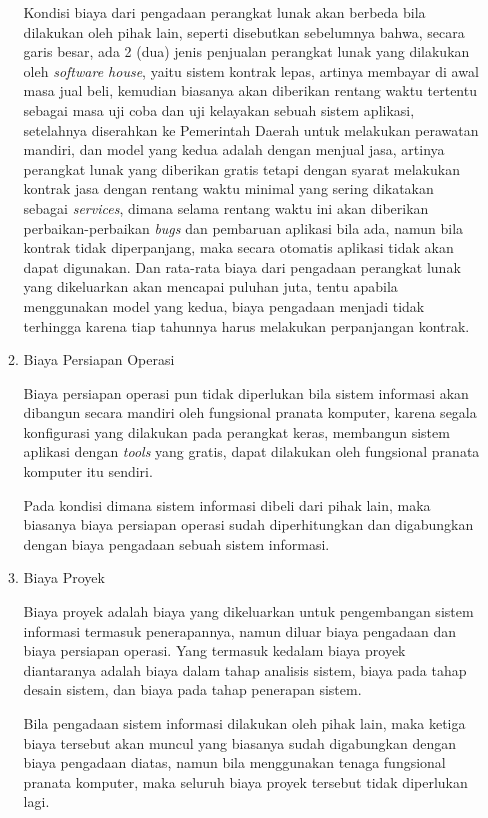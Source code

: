 \documentclass[pdftex,12pt, oneside]{article}
\begin{document}
\begin{enumerate}
\begin{enumerate}
Kondisi biaya dari pengadaan perangkat lunak akan berbeda bila dilakukan oleh pihak lain, seperti disebutkan sebelumnya bahwa, secara garis besar, ada 2 (dua) jenis penjualan perangkat lunak yang dilakukan oleh \textit{software house}, yaitu sistem kontrak lepas, artinya membayar di awal masa jual beli, kemudian biasanya akan diberikan rentang waktu tertentu sebagai masa uji coba dan uji kelayakan sebuah sistem aplikasi, setelahnya diserahkan ke Pemerintah Daerah untuk melakukan perawatan mandiri, dan model yang kedua adalah dengan menjual jasa, artinya perangkat lunak yang diberikan gratis tetapi dengan syarat melakukan kontrak jasa dengan rentang waktu minimal yang sering dikatakan sebagai \textit{services}, dimana selama rentang waktu ini akan diberikan perbaikan-perbaikan \textit{bugs} dan pembaruan aplikasi bila ada, namun bila kontrak tidak diperpanjang, maka secara otomatis aplikasi tidak akan dapat digunakan. Dan rata-rata biaya dari pengadaan perangkat lunak yang dikeluarkan akan mencapai puluhan juta, tentu apabila menggunakan model yang kedua, biaya pengadaan menjadi tidak terhingga karena tiap tahunnya harus melakukan perpanjangan kontrak.	
	
	\item Biaya Persiapan Operasi
	
Biaya persiapan operasi pun tidak diperlukan bila sistem informasi akan dibangun secara mandiri oleh fungsional pranata komputer, karena segala konfigurasi yang dilakukan pada perangkat keras, membangun sistem aplikasi dengan \textit{tools} yang gratis, dapat dilakukan oleh fungsional pranata komputer itu sendiri.

Pada kondisi dimana sistem informasi dibeli dari pihak lain, maka biasanya biaya persiapan operasi sudah diperhitungkan dan digabungkan dengan biaya pengadaan sebuah sistem informasi.	
	
	\item Biaya Proyek
	
Biaya proyek adalah biaya yang dikeluarkan untuk pengembangan sistem informasi termasuk penerapannya, namun diluar biaya pengadaan dan biaya persiapan operasi. Yang termasuk kedalam biaya proyek diantaranya adalah biaya dalam tahap analisis sistem, biaya pada tahap desain sistem, dan biaya pada tahap penerapan sistem.

Bila pengadaan sistem informasi dilakukan oleh pihak lain, maka ketiga biaya tersebut akan muncul yang biasanya sudah digabungkan dengan biaya pengadaan diatas, namun bila menggunakan tenaga fungsional pranata komputer, maka seluruh biaya proyek tersebut tidak diperlukan lagi.	
	

\end{enumerate}
\end{enumerate}
\end{document}
